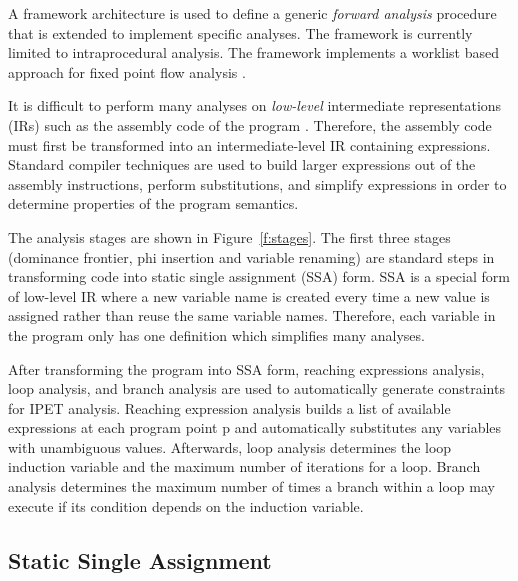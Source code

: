 	A framework architecture is used to define a generic \emph{forward analysis} procedure that is extended to implement specific analyses. The framework is currently limited to intraprocedural analysis. The framework implements a worklist based approach for fixed point flow analysis \cite{andrew2002modern}.

	 
	It is difficult to perform many analyses on \emph{low-level} intermediate representations (IRs) such as the assembly code of the program \cite{andrew2002modern}. 
	Therefore, the assembly code must first be transformed into an intermediate-level IR containing expressions. 
	Standard compiler techniques \cite{andrew2002modern} are used to build larger expressions out of the assembly instructions, perform substitutions, and simplify expressions in order to determine properties of the program semantics. 

	The analysis stages are shown in Figure~\ref{f:stages}. 
	The first three stages (dominance frontier, phi insertion and variable renaming) are standard steps in transforming code into static single assignment (SSA) form. 
	SSA is a special form of low-level IR where a new variable name is created every time a new value is assigned rather than reuse the same variable names. 
	Therefore, each variable in the program only has one definition which simplifies many analyses.	
	
	After transforming the program into SSA form, reaching expressions analysis, loop analysis, and branch analysis are used to automatically generate constraints for IPET analysis. 
	Reaching expression analysis builds a list of available expressions at each program point p and automatically substitutes any variables with unambiguous values. 
	Afterwards, loop analysis determines the loop induction variable and the maximum number of iterations for a loop. 
	Branch analysis determines the maximum number of times a branch within a loop may execute if its condition depends on the induction variable.

\subsection{Static Single Assignment}
	
